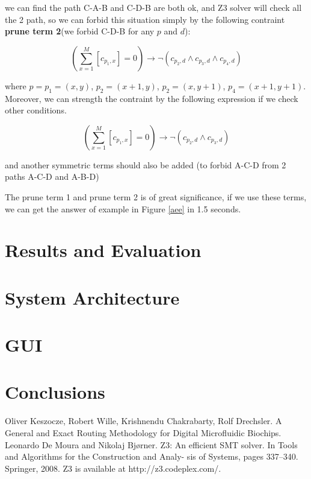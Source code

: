 \documentclass[twocolumn]{article}
\begin{document}
we can find the path C-A-B and C-D-B are both ok, and Z3 solver will check all the 2 path, so we can forbid this situation simply by the following contraint \textbf{prune term 2}(we forbid C-D-B for any $p$ and $d$):

\[
(\sum_{x=1}^{M}{[c_{p_1,x}]} = 0) \to \neg(c_{p_2,d} \wedge c_{p_3,d} \wedge c_{p_4,d})
\]

where $p = p_1 = (x, y)$, $p_2 = (x + 1, y)$, $p_2 = (x, y + 1)$, $p_4 = (x + 1, y + 1)$. Moreover, we can strength the contraint by the following expression if we check other conditions.

\[
(\sum_{x=1}^{M}{[c_{p_1,x}]} = 0) \to \neg(c_{p_2,d} \wedge c_{p_3,d})
\]

and another symmetric terms should also be added (to forbid A-C-D from 2 paths A-C-D and A-B-D)

The prune term 1 and prune term 2 is of great significance, if we use these terms, we can get the answer of example in Figure \ref{aee} in 1.5 seconds.

\section{Results and Evaluation}


\section{System Architecture}

\section{GUI}

\section{Conclusions}

\begin{thebibliography}{1}
Oliver Keszocze, Robert Wille, Krishnendu Chakrabarty, Rolf Drechsler. A General and Exact Routing Methodology for Digital Microfluidic Biochips.
Leonardo De Moura and Nikolaj Bjørner. Z3: An efficient SMT solver. In Tools and Algorithms for the Construction and Analy- sis of Systems, pages 337–340. Springer, 2008. Z3 is available at http://z3.codeplex.com/.
\end{thebibliography}
\end{document}
